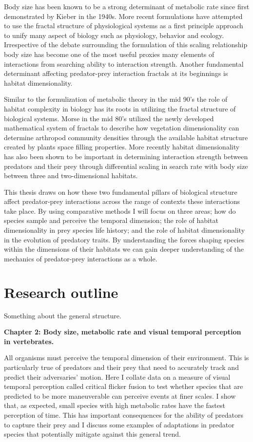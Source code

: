 Body size has been known to be a strong determinant of metabolic rate since first demonstrated by Kieber in the 1940s. More recent formulations have attempted to use the fractal structure of physiological systems as a first principle approach to unify many aspect of biology such as physiology, behavior and ecology. Irrespective of the debate surrounding the formulation of this scaling relationship body size has become one of the most useful proxies many elements of interactions from searching ability to interaction strength. Another fundamental determinant affecting predator-prey interaction fractals at its beginnings is habitat dimensionality.


Similar to the formulization of metabolic theory in the mid 90's the role of habitat complexity in biology has its roots in utilizing the fractal structure of biological systems. Morse in the mid 80's utilized the newly developed mathematical system of fractals to describe how vegetation dimensionality can determine arthropod community densities through the available habitat structure created by plants space filling properties. More recently habitat dimensionality has also been shown to be important in determining interaction strength between predators and their prey through differential scaling in search rate with body size between three and two-dimensional habitats. 


This thesis draws on how these two fundamental pillars of biological structure affect predator-prey interactions across the range of contexts these interactions take place. By using comparative methods I will focus on three areas; how do species sample and perceive the temporal dimension; the role of habitat dimensionality in prey species life history; and the role of habitat dimensionality in the evolution of predatory traits. By understanding the forces shaping species within the dimensions of their habitats we can gain deeper understanding of the mechanics of predator-prey interactions as a whole.


\section{\uppercase{R}esearch outline}
Something about the general structure.


\textbf{Chapter 2: Body size, metabolic rate and visual temporal perception in vertebrates.}

 All organisms must perceive the temporal dimension of their environment. This is particularly true of predators and their prey that need to accurately track and predict their adversaries' motion. Here I collate data on a measure of visual temporal perception called critical flicker fusion to test whether species that are predicted to be more maneuverable can perceive events at finer scales. I show that, as expected, small species with high metabolic rates have the fastest perception of time. This has important consequences for the ability of predators to capture their prey and I discuss some examples of adaptations in predator species that potentially mitigate against this general trend. 




